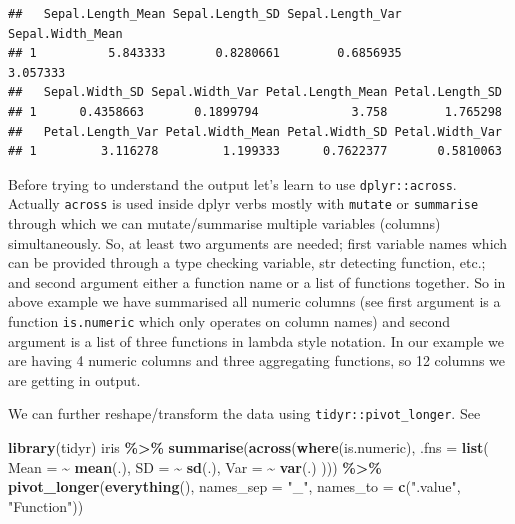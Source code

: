 \documentclass[
]{book}
\newenvironment{Shaded}{\begin{snugshade}}{\end{snugshade}}
\newcommand{\AttributeTok}[1]{\textcolor[rgb]{0.13,0.29,0.53}{#1}}
\newcommand{\FunctionTok}[1]{\textcolor[rgb]{0.13,0.29,0.53}{\textbf{#1}}}
\newcommand{\NormalTok}[1]{#1}
\newcommand{\SpecialCharTok}[1]{\textcolor[rgb]{0.81,0.36,0.00}{\textbf{#1}}}
\newcommand{\StringTok}[1]{\textcolor[rgb]{0.31,0.60,0.02}{#1}}
\begin{document}
\begin{verbatim}
##   Sepal.Length_Mean Sepal.Length_SD Sepal.Length_Var Sepal.Width_Mean
## 1          5.843333       0.8280661        0.6856935         3.057333
##   Sepal.Width_SD Sepal.Width_Var Petal.Length_Mean Petal.Length_SD
## 1      0.4358663       0.1899794             3.758        1.765298
##   Petal.Length_Var Petal.Width_Mean Petal.Width_SD Petal.Width_Var
## 1         3.116278         1.199333      0.7622377       0.5810063
\end{verbatim}

Before trying to understand the output let's learn to use \texttt{dplyr::across}. Actually \texttt{across} is used inside dplyr verbs mostly with \texttt{mutate} or \texttt{summarise} through which we can mutate/summarise multiple variables (columns) simultaneously. So, at least two arguments are needed; first variable names which can be provided through a type checking variable, str detecting function, etc.; and second argument either a function name or a list of functions together. So in above example we have summarised all numeric columns (see first argument is a function \texttt{is.numeric} which only operates on column names) and second argument is a list of three functions in lambda style notation. In our example we are having 4 numeric columns and three aggregating functions, so 12 columns we are getting in output.

We can further reshape/transform the data using \texttt{tidyr::pivot\_longer}. See

\begin{Shaded}
\begin{Highlighting}[]
\FunctionTok{library}\NormalTok{(tidyr)}
\NormalTok{iris }\SpecialCharTok{\%\textgreater{}\%}
  \FunctionTok{summarise}\NormalTok{(}\FunctionTok{across}\NormalTok{(}\FunctionTok{where}\NormalTok{(is.numeric),}
                   \AttributeTok{.fns =} \FunctionTok{list}\NormalTok{(}
                     \AttributeTok{Mean =} \SpecialCharTok{\textasciitilde{}} \FunctionTok{mean}\NormalTok{(.),}
                     \AttributeTok{SD =} \SpecialCharTok{\textasciitilde{}} \FunctionTok{sd}\NormalTok{(.),}
                     \AttributeTok{Var =} \SpecialCharTok{\textasciitilde{}} \FunctionTok{var}\NormalTok{(.)}
\NormalTok{                   ))) }\SpecialCharTok{\%\textgreater{}\%}
  \FunctionTok{pivot\_longer}\NormalTok{(}\FunctionTok{everything}\NormalTok{(),}
               \AttributeTok{names\_sep =} \StringTok{"\_"}\NormalTok{,}
               \AttributeTok{names\_to =} \FunctionTok{c}\NormalTok{(}\StringTok{".value"}\NormalTok{, }\StringTok{"Function"}\NormalTok{))}
\end{Highlighting}
\end{Shaded}
\end{document}
